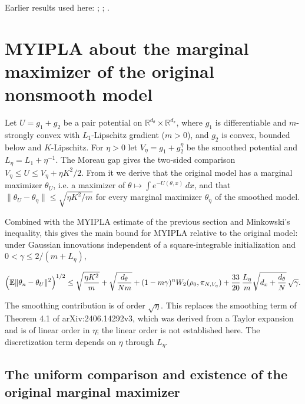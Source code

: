 \documentclass[11pt,a4paper]{report}
\begin{document}
Earlier results used here: \cite[Section~3.48.1]{LangevinLean2026ULASC}; \cite[Section~3.48.2]{LangevinLean2026ULASC}; \cite[Section~3.48.7]{LangevinLean2026ULASC}.
\section{\texorpdfstring{MYIPLA about the marginal maximizer of the original nonsmooth model}{MYIPLA about the marginal maximizer of the original nonsmooth model}}
\label{proof-module-ProximalLangevin-Theorem-lean}


Let \(U=g_1+g_2\) be a pair potential on \(\mathbb R^{d_\theta}\times\mathbb R^{d_x}\), where \(g_1\) is differentiable and \(m\)-strongly convex with \(L_1\)-Lipschitz gradient (\(m>0\)), and \(g_2\) is convex, bounded below and \(K\)-Lipschitz. For \(\eta>0\) let \(V_\eta=g_1+g_2^\eta\) be the smoothed potential and \(L_\eta=L_1+\eta^{-1}\). The Moreau gap gives the two-sided comparison \(V_\eta\le U\le V_\eta+\eta K^2/2\). From it we derive that the original model has a marginal maximizer \(\theta_U\), i.e. a maximizer of \(\theta\mapsto\int e^{-U(\theta,x)}\,dx\), and that \(\|\theta_U-\theta_\eta\|\le\sqrt{\eta K^2/m}\) for every marginal maximizer \(\theta_\eta\) of the smoothed model.




Combined with the MYIPLA estimate of the previous section and Minkowski's inequality, this gives the main bound for MYIPLA relative to the original model: under Gaussian innovations independent of a square-integrable initialization and \(0<\gamma\le2/(m+L_\eta)\),


\[\Bigl(\mathbb E\|\theta_n-\theta_U\|^2\Bigr)^{1/2}\le\sqrt{\frac{\eta K^2}{m}}+\sqrt{\frac{d_\theta}{Nm}}+(1-m\gamma)^nW_2(\rho_0,\pi_{N,V_\eta})+\frac{33}{20}\,\frac{L_\eta}{m}\sqrt{d_x+\frac{d_\theta}N}\,\sqrt\gamma .\]


The smoothing contribution is of order \(\sqrt\eta\). This replaces the smoothing term of Theorem 4.1 of arXiv:2406.14292v3, which was derived from a Taylor expansion and is of linear order in \(\eta\); the linear order is not established here. The discretization term depends on \(\eta\) through \(L_\eta\).

\subsection{\texorpdfstring{The uniform comparison and existence of the original marginal maximizer}{The uniform comparison and existence of the original marginal maximizer}}
\label{report-step-ProximalLangevin-Theorem-lean-1}
\end{document}
